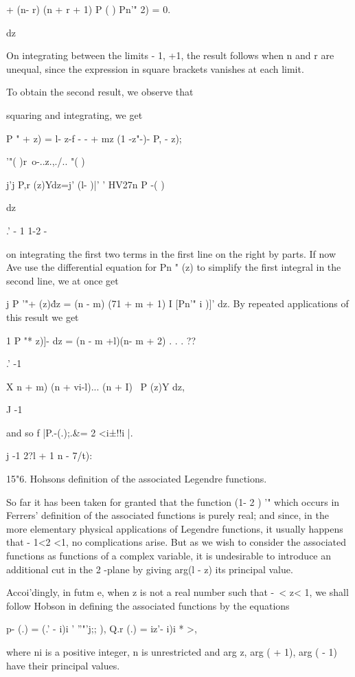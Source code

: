 {{{+ (n- r) (n + r + 1) P ( ) Pn'" 2) = 0.

dz

%
%

On integrating between the limits - 1, +1, the result follows when n
and r are unequal, since the expression in square brackets vanishes at
each limit.

To obtain the second result, we observe that

squaring and integrating, we get

P " + z) = l- z-f - - + mz (1 -z"-)- P, - z);

  '"( )r\ o-..z.,./.. "( )

j'j P,r (z)Ydz=j' (l- )|' ' HV27n P -( )

dz

.' - 1 1-2 -

on integrating the first two terms in the first line on the right by
parts. If now Ave use the differential equation for Pn " (z) to
simplify the first integral in the second line, we at once get

j P '"+ (z)\' dz = (n - m) (71 + m + 1) I [Pn'" i )]' dz. By repeated
applications of this result we get

1 P "* z)]- dz = (n - m +l)(n- m + 2) . . . ??

.' -1

X n + m) (n + vi-l)... (n + I) \ P (z)Y dz,

J -1

and so f |P.-(.);.\&= 2 <i±!!i |.

j -1 2?l + 1 n - 7/t):

15"6. Hohsons definition of the associated Legendre functions.

So far it has been taken for granted that the function (1- 2 ) '"
which occurs in Ferrers' definition of the associated functions is
purely real; and since, in the more elementary physical applications
of Legendre functions, it usually happens that - 1<2 <1, no
complications arise. But as we wish to consider the associated
functions as functions of a complex variable, it is undesirable to
introduce an additional cut in the 2 -plane by giving arg(l - z) its
principal value.

Accoi'dingly, in futm e, when z is not a real number such that -\ < z<
1, we shall follow Hobson in defining the associated functions by the
equations

p- (.) = (.' - i)i ' ''"'j;; ), Q.r (.) = iz'- i)i * >,

where ni is a positive integer, n is unrestricted and arg z, arg ( +
1), arg ( - 1) have their principal values.

}}}
